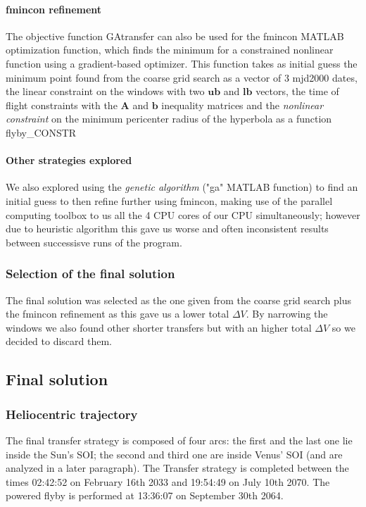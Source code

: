 \documentclass[11pt,a4paper]{report}
\renewcommand{\vec}[1]{\mathbf{#1}}
\begin{document}
\paragraph{fmincon refinement}
The objective function GAtransfer can also be used for the fmincon MATLAB optimization function, which finds the minimum for a constrained nonlinear function using a gradient-based optimizer. This function takes as initial guess the minimum point found from the coarse grid search as a vector of 3 mjd2000 dates, the linear constraint on the windows with two $\vec{ub}$ and $\vec{lb}$ vectors, the time of flight constraints with the $\vec{A}$ and $\vec{b}$ inequality matrices and the \emph{nonlinear constraint} on the minimum pericenter radius of the hyperbola as a function flyby\_CONSTR\\
\paragraph{Other strategies explored}

We also explored using the \emph{genetic algorithm} ("ga" MATLAB function) to find an initial guess to then refine further using fmincon, making use of the parallel computing toolbox to us all the 4 CPU cores of our CPU simultaneously; however due to heuristic algorithm this gave us worse and often inconsistent results between successisve runs of the program.

\subsubsection{Selection of the final solution}
The final solution was selected as the one given from the coarse grid search plus the fmincon refinement as this gave us a lower total $\Delta V$. By narrowing the windows we also found other shorter transfers but with an higher total $\Delta V$ so we decided to discard them.

\subsection{Final solution}

\subsubsection{Heliocentric trajectory}
The final transfer strategy is composed of four arcs: the first and the last one lie inside the Sun’s SOI; the second and third one are inside Venus’ SOI (and are analyzed in a later paragraph). 
The Transfer strategy is completed between the times 02:42:52 on February 16th 2033 and 19:54:49 on July 10th 2070. The powered flyby is performed at 13:36:07 on September 30th 2064.\\
\end{document}
